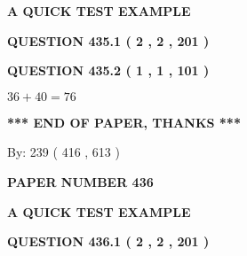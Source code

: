 \documentclass[12pt]{article}
\begin{document}
   
\vspace{0.2in}
   
   
   
   
   
   
 \vspace{0.2in}
{\LARGE {\textbf{ A QUICK TEST EXAMPLE}}}
   
   
  
\vspace{0.2in}
  
{\textbf{\Large{QUESTION
435.1 
 ( 2 , 2 , 201 )
}}}
  
  
  
\vspace{0.2in}
  
{\textbf{\Large{QUESTION
435.2 
 ( 1 , 1 , 101 )
}}}
  
  
 
 

$ %
36 +  %
40=   %
76$
 
 
   
   
 \vspace{0.2in}
 
   
   
   
   
\vspace{1.0in} 
{\textbf{\large{ *** END OF PAPER, THANKS *** }}} 
   
   
\hspace{1.0in} By: 
 239 ( 416 ,  613 )
   
   
   
   
\newpage 
\setcounter{page}{ 
   436001 } 
   
   
   
   
 {\textbf{ \Large{ PAPER NUMBER  436  }}}
   
   
\vspace{0.2in}
   
   
   
   
   
   
 \vspace{0.2in}
{\LARGE {\textbf{ A QUICK TEST EXAMPLE}}}
   
   
  
\vspace{0.2in}
  
{\textbf{\Large{QUESTION
436.1 
 ( 2 , 2 , 201 )
}}}
  
\end{document}
